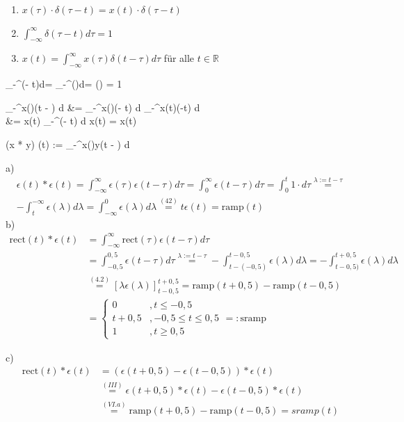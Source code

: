 \documentclass[parskip=half]{scrreprt}
\newcommand{\rect}{\text{rect}}
\newcommand{\ramp}{\text{ramp}}
\newcommand{\sramp}{\text{sramp}}
\begin{document}
\begin{tbox}
 \begin{enumerate}[label=\Roman*)]
 	\item $x(\tau) \cdot \delta(\tau - t) = x(t) \cdot \delta(\tau - t)$
 	\item $\int_{-\infty}^{\infty}\delta(\tau - t)d\tau = 1$
 	\item $x(t) = \int_{-\infty}^{\infty}x(\tau)\delta(t-\tau)d\tau$ für alle $ t \in \mathbb{R}$
 \end{enumerate}
\end{tbox}

\begin{abox}
	\int_{-\infty}^{\infty}\delta(\tau - t)d\tau = \int_{-\infty}^{\infty}\delta(\lambda)d\lambda = \epsilon(\infty) = 1
\end{abox}


\begin{abox}
	\int_{-\infty}^{\infty}x(\tau)\delta(t  - \tau) d \tau &= 	\int_{-\infty}^{\infty}x(\tau)\delta(\tau - t) d \tau {}	\int_{-\infty}^{\infty}x(t)\delta(\tau -t) d \tau \\
	&= x(t)	\int_{-\infty}^{\infty}\delta(\tau - t) d \tau {} x(t)  = x(t)
\end{abox}

\begin{abox}
	(x * y) (t) := 	\int_{-\infty}^{\infty}x(\tau)y(t  - \tau) d \tau
\end{abox}

\begin{tbox}
	a) \begin{align*}\epsilon(t) * \epsilon(t) = \int_{-\infty}^{\infty}\epsilon(\tau)\epsilon(t  - \tau) d \tau = 
	\int_{0}^{\infty}\epsilon(t  - \tau) d \tau = 	\int_{0}^{t}1 \cdot d\tau \overset{\lambda := t-\tau}{=}\\
		-\int_{t}^{-\infty}\epsilon(\lambda) d \lambda = 
			\int_{-\infty}^{0}\epsilon(\lambda) d \lambda \overset{(42)}{=} t\epsilon(t) = \text{ramp}(t)\end{align*}
	b) \begin{align*}
	\text{rect}(t) * \epsilon(t) &= 	\int_{-\infty}^{\infty}\rect(\tau)\epsilon(t  - \tau) d \tau \\&= 
		\int_{-0,5}^{0,5}\epsilon(t  - \tau) d \tau \overset{\lambda := t-\tau}{=}
		-\int_{t-(-0,5)}^{t-0,5}\epsilon(\lambda) d \lambda = 
		-\int_{t-0,5)}^{t+0,5}\epsilon(\lambda) d \lambda\\ &\overset{(4.2)}{=}[\lambda\epsilon(\lambda)]_{t-0,5}^{t+0,5}
		= \ramp(t+0,5) - \ramp(t-0,5)\\
		&= \begin{cases}
		0 &, t \leq -0,5\\
		t+0,5 &, -0,5 \leq t \leq 0,5\\
		1 &, t \geq 0,5
		\end{cases} =: \sramp
		\end{align*}
\end{tbox}

\begin{tbox}
	c) \begin{align*}
		\rect(t) * \epsilon(t) &= (\epsilon(t+0,5) - \epsilon(t-0,5)) * \epsilon(t)\\
		 &\overset{(III)}{=}\epsilon(t +0,5) * \epsilon(t) - \epsilon(t-0,5) * \epsilon(t)\\
		 &\overset{(VI.a)}{=} \ramp(t + 0,5) - \ramp( t - 0,5) = sramp(t)
	\end{align*}
\end{tbox}
\end{document}
